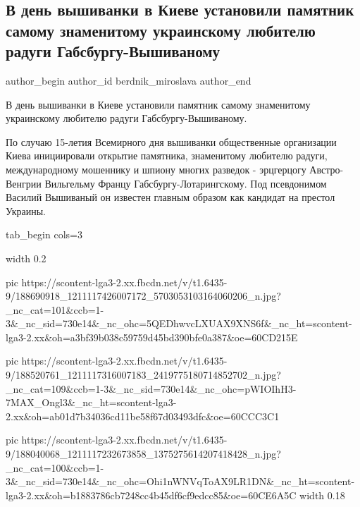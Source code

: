  
 
 
 
 
 
\subsection{В день вышиванки в Киеве установили памятник самому знаменитому украинскому любителю радуги Габсбургу-Вышиваному}
\label{sec:20_05_2021.fb.berdnik_miroslava.2.pamjatnik_vyshyvanyj}
\ifcmt
 author_begin
   author_id berdnik_miroslava
 author_end
\fi

В день вышиванки в Киеве установили памятник самому знаменитому украинскому любителю радуги Габсбургу-Вышиваному.

По случаю 15-летия Всемирного дня вышиванки общественные организации Киева
инициировали открытие памятника, знаменитому любителю радуги, международному
мошеннику и шпиону многих разведок - эрцгерцогу Австро-Венгрии Вильгельму
Францу Габсбургу-Лотарингскому. Под псевдонимом Василий Вышиваный он известен
главным образом как кандидат на престол Украины.

\ifcmt
tab_begin cols=3

	width 0.2

  pic https://scontent-lga3-2.xx.fbcdn.net/v/t1.6435-9/188690918_1211117426007172_5703053103164060206_n.jpg?_nc_cat=101&ccb=1-3&_nc_sid=730e14&_nc_ohc=5QEDhwvcLXUAX9XNS6f&_nc_ht=scontent-lga3-2.xx&oh=a3bf39b038c59759d45bd390bfe0a387&oe=60CD215E

  pic https://scontent-lga3-2.xx.fbcdn.net/v/t1.6435-9/188520761_1211117316007183_2419775180714852702_n.jpg?_nc_cat=109&ccb=1-3&_nc_sid=730e14&_nc_ohc=pWIOIhH3-7MAX_Ongl3&_nc_ht=scontent-lga3-2.xx&oh=ab01d7b34036cd11be58f67d03493dfc&oe=60CCC3C1

  pic https://scontent-lga3-2.xx.fbcdn.net/v/t1.6435-9/188040068_1211117232673858_1375275614207418428_n.jpg?_nc_cat=100&ccb=1-3&_nc_sid=730e14&_nc_ohc=Ohi1nWNVqToAX9LR1DN&_nc_ht=scontent-lga3-2.xx&oh=b1883786cb7248cc4b45df6cf9edcc85&oe=60CE6A5C
	width 0.18

